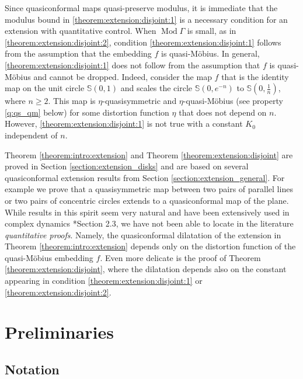 \documentclass[letterpaper]{amsart}
\theoremstyle{plain}
\theoremstyle{definition}
\theoremstyle{remark}
\numberwithin{equation}{section}
\numberwithin{theorem}{section}
\DeclareMathOperator{\Mod}{Mod}
\begin{document}
Since quasiconformal maps quasi-preserve modulus, it is immediate that the modulus bound in \ref{theorem:extension:disjoint:1} is a necessary condition for an extension with quantitative control. When $\Mod\Gamma$ is small, as in \ref{theorem:extension:disjoint:2}, condition \ref{theorem:extension:disjoint:1} follows from the assumption that the embedding $f$ is quasi-M\"obius. In general, \ref{theorem:extension:disjoint:1} does not follow from the assumption that $f$ is quasi-M\"obius and cannot be dropped. Indeed, consider the map $f$ that is the identity map on the unit circle $\mathbb S(0,1)$ and scales the circle $\mathbb S(0,e^{-n})$ to $\mathbb S(0,\frac{1}{n})$, where $n\geq 2$. This map is $\eta$-quasisymmetric and $\eta$-quasi-M\"obius (see property \ref{q:qs_qm} below) for some distortion function $\eta$ that does not depend on $n$. However, \ref{theorem:extension:disjoint:1} is not true with a constant $K_0$ independent of $n$.

Theorem \ref{theorem:intro:extension} and Theorem \ref{theorem:extension:disjoint} are proved in Section \ref{section:extension_disks} and are based on several quasiconformal extension results from Section \ref{section:extension_general}. For example we prove that a quasisymmetric map between two pairs of parallel lines or two pairs of concentric circles extends to a quasiconformal map of the plane. While results in this spirit seem very natural and have been extensively used in complex dynamics \cite{BrannerFagella:surgery}*{Section 2.3}, we have not been able to locate in the literature \textit{quantitative proofs}. Namely, the quasiconformal dilatation of the extension in Theorem \ref{theorem:intro:extension} depends only on the distortion function of the quasi-M\"obius embedding $f$. Even more delicate is the proof of Theorem \ref{theorem:extension:disjoint}, where the dilatation depends also on the constant appearing in condition \ref{theorem:extension:disjoint:1} or \ref{theorem:extension:disjoint:2}.  


\section{Preliminaries}\label{section:preliminaries}

\subsection{Notation}
\end{document}
